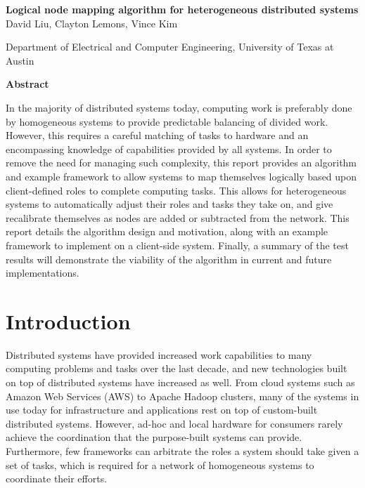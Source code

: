 \documentclass[11pt]{article}
\begin{document}
\newpage
\begin{center}
{\Large \textbf{Logical node mapping algorithm for heterogeneous distributed systems}}\\[1.0cm]
David Liu, Clayton Lemons, Vince Kim

\vspace{.1 in}
Department of Electrical and Computer Engineering, University of Texas at Austin

\vspace{.1 in}
\end{center}
\begin{multicols}{2}
\begin{center}

\textbf{Abstract}
\end{center}
In the majority of distributed systems today, computing work is preferably done by homogeneous systems to provide predictable balancing of divided work.  However, this requires a careful matching of tasks to hardware and an encompassing knowledge of capabilities provided by all systems.  In order to remove the need for managing such complexity, this report provides an algorithm and example framework to allow systems to map themselves logically based upon client-defined roles to complete computing tasks.  This allows for heterogeneous systems to automatically adjust their roles and tasks they take on, and give recalibrate themselves as nodes are added or subtracted from the network.  This report details the algorithm design and motivation, along with an example framework to implement on a client-side system.  Finally, a summary of the test results will demonstrate the viability of the algorithm in current and future implementations.

\section{Introduction}
Distributed systems have provided increased work capabilities to many computing problems and tasks over the last decade, and new technologies built on top of distributed systems have increased as well.  From cloud systems such as Amazon Web Services (AWS) to Apache Hadoop clusters, many of the systems in use today for infrastructure and applications rest on top of custom-built distributed systems.  However, ad-hoc and local hardware for consumers rarely achieve the coordination that the purpose-built systems can provide.  Furthermore, few frameworks can arbitrate the roles a system should take given a set of tasks, which is required for a network of homogeneous systems to coordinate their efforts.


\end{multicols}
\end{document}
